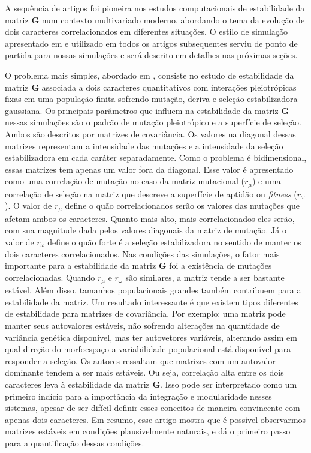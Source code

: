 A sequência de artigos \cite{Jones2003, Jones2004, Jones2007} foi
pioneira nos estudos computacionais de estabilidade da matriz
$\mathbf{G}$ num contexto multivariado moderno, abordando o tema da
evolução de dois caracteres correlacionados em diferentes situações.
O estilo de simulação apresentado em \cite{Jones2003} e utilizado em
todos os artigos subsequentes serviu de ponto de partida para nossas
simulações e será descrito em detalhes nas próximas seções.

O problema mais simples, abordado em \cite{Jones2003}, consiste no
estudo de estabilidade da matriz $\mathbf{G}$ associada a dois caracteres
quantitativos com interações pleiotrópicas fixas em uma população finita
sofrendo mutação, deriva e seleção estabilizadora gaussiana.
Os principais parâmetros que influem na estabilidade da matriz
$\mathbf{G}$ nessas simulações são o padrão de mutação pleiotrópico e a
superfície de seleção.
Ambos são descritos por matrizes de covariância.
Os valores na diagonal dessas matrizes representam a intensidade das
mutações e a intensidade da seleção estabilizadora em cada caráter
separadamente.
Como o problema é bidimensional, essas matrizes tem apenas um valor fora
da diagonal.
Esse valor é apresentado como uma correlação de mutação no caso da
matriz mutacional ($r_\mu$) e uma correlação de seleção na matriz que
descreve a superfície de aptidão ou {\it fitness} ($r_\omega$).
O valor de $r_\mu$ define o quão correlacionados serão os valores das
mutações que afetam ambos os caracteres.
Quanto mais alto, mais correlacionados eles serão, com sua magnitude
dada pelos valores diagonais da matriz de mutação.
Já o valor de $r_\omega$ define o quão forte é a seleção estabilizadora
no sentido de manter os dois caracteres correlacionados.
Nas condições das simulações, o fator mais importante para a
estabilidade da matriz $\mathbf{G}$ foi a existência de mutações
correlacionadas.
Quando $r_\mu$ e $r_\omega$ são similares, a matriz tende a ser bastante
estável.
Além disso, tamanhos populacionais grandes também contribuem para a
estabilidade da matriz.
Um resultado interessante é que existem tipos diferentes de estabilidade
para matrizes de covariância.
Por exemplo: uma matriz pode manter seus autovalores estáveis, não
sofrendo alterações na quantidade de variância genética disponível, mas
ter autovetores variáveis, alterando assim em qual direção do
morfoespaço a variabilidade populacional está disponível para responder
a seleção.
Os autores ressaltam que matrizes com um autovalor dominante tendem a
ser mais estáveis.
Ou seja, correlação alta entre os dois caracteres leva à estabilidade da
matriz $\mathbf{G}$.
Isso pode ser interpretado como um primeiro indício para a importância
da integração e modularidade nesses sistemas, apesar de ser difícil definir
esses conceitos de maneira convincente com apenas dois caracteres.
Em resumo, esse artigo mostra que é possível observarmos matrizes
estáveis em condições plausivelmente naturais, e dá o primeiro passo
para a quantificação dessas condições.

